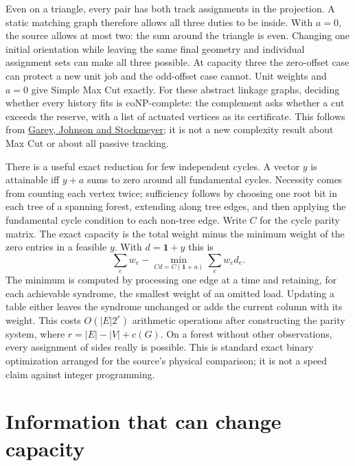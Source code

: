 \documentclass[11pt]{article}
\begin{document}
Even on a triangle, every pair has both track assignments in the projection.
A static matching graph therefore allows all three duties to be inside.
With \(a=0\), the source allows at most two: the sum around the triangle
is even. Changing one initial orientation while leaving the same final
geometry and individual assignment sets can make all three possible.
At capacity three the zero-offset case can protect a new unit job and the
odd-offset case cannot. Unit weights and \(a=0\) give Simple Max Cut exactly.
For these abstract linkage graphs, deciding whether every history fits
is coNP-complete: the complement asks whether a cut exceeds the reserve,
with a list of actuated vertices as its certificate. This follows from
\href{https://doi.org/10.1016/0304-3975(76)90059-1}{Garey, Johnson
and Stockmeyer}; it is not a new complexity result about Max Cut or about
all passive tracking.

There is a useful exact reduction for few independent cycles. A vector
\(y\) is attainable iff \(y+a\) sums to zero around all fundamental cycles.
Necessity comes from counting each vertex twice; sufficiency follows by
choosing one root bit in each tree of a spanning forest, extending along
tree edges, and then applying the fundamental cycle condition to each
non-tree edge. Write \(C\) for the cycle parity matrix. The exact
capacity is the total weight minus the minimum weight of the zero entries
in a feasible \(y\). With \(d=\mathbf1+y\) this is
\[
 \sum_e w_e-\min_{Cd=C(\mathbf1+a)}\sum_e w_e d_e.
\]
The minimum is computed by processing one edge at a time and retaining, for
each achievable syndrome, the smallest weight of an omitted load. Updating
a table either leaves the syndrome unchanged or adds the current column
with its weight. This costs \(O(|E|2^r)\) arithmetic operations after
constructing the parity system, where \(r=|E|-|V|+c(G)\). On a forest
without other observations, every assignment of sides really is possible.
This is standard exact binary optimization arranged for the source's
physical comparison; it is not a speed claim against integer programming.

\section{Information that can change capacity}
\end{document}
